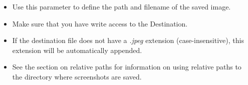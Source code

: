 \begin{itemize}
\item Use this parameter to define the path and filename of the saved image.
\item Make sure that you have write access to the Destination.
\item If the destination file does not have a \emph{.jpeg} extension (case-insensitive), this extension will be automatically appended.
\item See the section on relative paths  for information on using relative paths to the directory where screenshots are saved.
\end{itemize}
